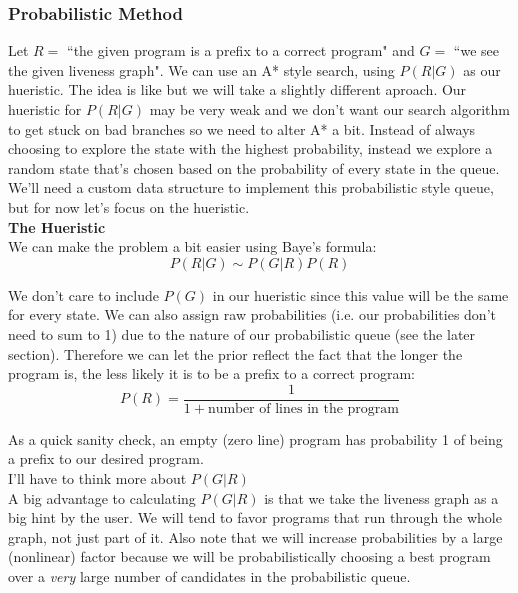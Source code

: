 \documentclass[12pt]{article}
\begin{document}
\subsubsection{Probabilistic Method}
Let $R=$ ``the given program is a prefix to a correct program" and $G=$ ``we see the given liveness graph".  We can use an A* style search, using $P(R|G)$ as our hueristic.  The idea is like \cite{huer} but we will take a slightly different aproach.  Our hueristic for $P(R|G)$ may be very weak and we don't want our search algorithm to get stuck on bad branches so we need to alter A* a bit.  Instead of always choosing to explore the state with the highest probability, instead we explore a random state that's chosen based on the probability of every state in the queue.  We'll need a custom data structure to implement this probabilistic style queue, but for now let's focus on the hueristic.  \\

\textbf{The Hueristic} \\
We can make the problem a bit easier using Baye's formula:
$$P(R|G) \sim P(G|R)P(R)$$

We don't care to include $P(G)$ in our hueristic since this value will be the same for every state.  We can also assign raw probabilities (i.e. our probabilities don't need to sum to 1) due to the nature of our probabilistic queue (see the later section).  Therefore we can let the prior reflect the fact that the longer the program is, the less likely it is to be a prefix to a correct program:
$$P(R)= \frac{1}{1 + \text{number of lines in the program}}$$

As a quick sanity check, an empty (zero line) program has probability 1 of being a prefix to our desired program.  \\

I'll have to think more about $P(G|R)$ \\

A big advantage to calculating $P(G|R)$ is that we take the liveness graph as a big hint by the user.  We will tend to favor programs that run through the whole graph, not just part of it.  Also note that we will increase probabilities by a large (nonlinear) factor because we will be probabilistically choosing a best program over a \textit{very} large number of candidates in the probabilistic queue.  \\
\end{document}
